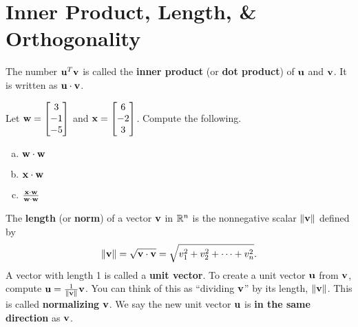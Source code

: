 \section[Inner Prod., Length, \& Orth.]{Inner Product, Length, \& Orthogonality}
\name[1.5in]


\begin{boxdef}
	The number $\boldsymbol{\mathbf{u}}^T\boldsymbol{\mathbf{v}}$ is called the \textbf{inner product} (or \textbf{dot product}) of $\boldsymbol{\mathbf{u}}$ and $\boldsymbol{\mathbf{v}}$. It is written as $\boldsymbol{\mathbf{u}}\cdot\boldsymbol{\mathbf{v}}$.
\end{boxdef}


\begin{exercise} %
	Let $\boldsymbol{\mathbf{w}}=\begin{bmatrix}3\\-1\\-5\end{bmatrix}$ and $\boldsymbol{\mathbf{x}}=\begin{bmatrix}6\\-2\\3\end{bmatrix}$. Compute the following.
	\begin{multicols}{2}
		\begin{enumerate}[(a)]
			\item $\boldsymbol{\mathbf{w}}\cdot\boldsymbol{\mathbf{w}}$
			\vspace{5em}
			\item $\boldsymbol{\mathbf{x}}\cdot\boldsymbol{\mathbf{w}}$
			\columnbreak
			\item $\frac{\boldsymbol{\mathbf{x}}\cdot\boldsymbol{\mathbf{w}}}{\boldsymbol{\mathbf{w}}\cdot\boldsymbol{\mathbf{w}}}$
		\end{enumerate}
	\end{multicols}
	\vspace{5em}
\end{exercise}


\begin{boxdef}
	The \textbf{length} (or \textbf{norm}) of a vector $\boldsymbol{\mathbf{v}}$ in $\mathbb{R}^n$ is the nonnegative scalar $\|\boldsymbol{\mathbf{v}}\|$ defined by
	$$ \|\boldsymbol{\mathbf{v}}\| = \sqrt{\boldsymbol{\mathbf{v}}\cdot\boldsymbol{\mathbf{v}}} = \sqrt{v_1^2+v_2^2+\cdots+v_n^2}. $$
	A vector with length 1 is called a \textbf{unit vector}. To create a unit vector $\boldsymbol{\mathbf{u}}$ from $\boldsymbol{\mathbf{v}}$, compute $\boldsymbol{\mathbf{u}}=\frac{1}{\|\boldsymbol{\mathbf{v}}\|}\boldsymbol{\mathbf{v}}$. You can think of this as ``dividing $\boldsymbol{\mathbf{v}}$'' by its length, $\|\boldsymbol{\mathbf{v}}\|$. This is called \textbf{normalizing} $\boldsymbol{\mathbf{v}}$. We say the new unit vector $\boldsymbol{\mathbf{u}}$ is \textbf{in the same direction} as $\boldsymbol{\mathbf{v}}$.
\end{boxdef}


